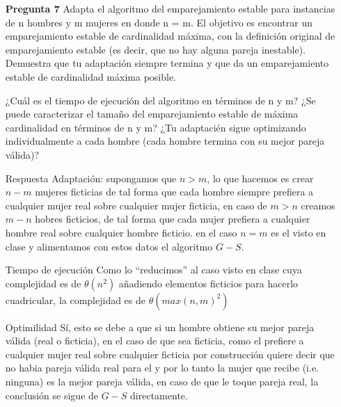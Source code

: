 \documentclass[12pt]{article}
\begin{document}
\lstset{language=python}
\begin{itemize}

\item[\bf{Pregunta 7}] Adapta el algoritmo del emparejamiento estable para instancias de n hombres y m mujeres en donde n = m. El objetivo es encontrar un emparejamiento estable de cardinalidad máxima, con la definición original de emparejamiento estable (es decir, que no hay alguna pareja inestable). Demuestra que tu adaptación siempre termina y que da un emparejamiento estable de cardinalidad máxima posible.

¿Cuál es el tiempo de ejecución del algoritmo en términos de n y m?
¿Se puede caracterizar el tamaño del emparejamiento estable de máxima
cardinalidad en términos de n y m?
¿Tu adaptacién sigue optimizando individualmente a cada hombre (cada hombre termina con su mejor pareja válida)?

\item[Respuesta] Adaptación: supongamos que $n > m$, lo que hacemos es crear $n-m$ mujeres ficticias de tal forma que cada hombre siempre prefiera a cualquier mujer real sobre cualquier mujer ficticia, en caso de $m > n$ creamos $m-n$ hobres ficticios, de tal forma que cada mujer prefiera a cualquier hombre real sobre cualquier hombre ficticio. en el caso $n = m$ es el visto en clase y alimentamos con estos datos el algoritmo $G-S$.
\item[Tiempo de ejecución] Como lo ``reducimos'' al caso visto en clase cuya complejidad es de $\theta(n^2)$ añadiendo elementos ficticios para hacerlo cuadricular, la complejidad es de  $\theta(max(n,m)^2)$

\item[Optimilidad] Sí, esto se debe a que si un hombre obtiene su mejor pareja válida (real o ficticia), en el caso de que sea ficticia, como el prefiere a cualquier mujer real sobre cualquier ficticia por construcción quiere decir que no habia pareja válida real para el y por lo tanto la mujer que recibe (i.e. ninguna) es la mejor pareja válida, en caso de que le toque pareja real, la conclusión se sigue de $G-S$ directamente.

\end{itemize}
\end{document}

